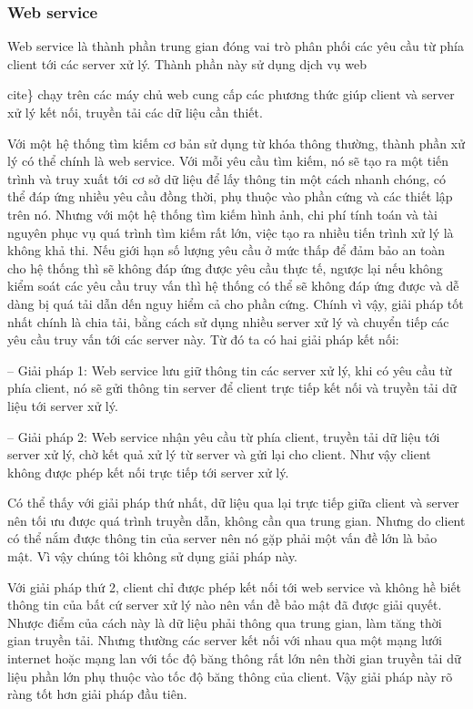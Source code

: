 \subsubsection{Web service}
Web service là thành phần trung gian đóng vai trò phân phối các yêu cầu từ phía client tới các server xử lý. Thành phần này sử dụng dịch vụ web {cite\} chạy trên các máy chủ web cung cấp các phương thức giúp client và server xử lý kết nối, truyền tải các dữ liệu cần thiết.

Với một hệ thống tìm kiếm cơ bản sử dụng từ khóa thông thường, thành phần xử lý có thể chính là web service. Với mỗi yêu cầu tìm kiếm, nó sẽ tạo ra một tiến trình và truy xuất tới cơ sở dữ liệu để lấy thông tin một cách nhanh chóng, có thể đáp ứng nhiều yêu cầu đồng thời, phụ thuộc vào phần cứng và các thiết lập trên nó. Nhưng với một hệ thống tìm kiếm hình ảnh, chi phí tính toán và tài nguyên phục vụ quá trình tìm kiếm rất lớn, việc tạo ra nhiều tiến trình xử lý là không khả thi. Nếu giới hạn số lượng yêu cầu ở mức thấp để đảm bảo an toàn cho hệ thống thì sẽ không đáp ứng được yêu cầu thực tế, ngược lại nếu không kiểm soát các yêu cầu truy vấn thì hệ thống có thể sẽ không đáp ứng được và dễ dàng bị quá tải dẫn dến nguy hiểm cả cho phần cứng. Chính vì vậy, giải pháp tốt nhất chính là chia tải, bằng cách sử dụng nhiều server xử lý và chuyển tiếp các yêu cầu truy vấn tới các server này. Từ đó ta có hai giải pháp kết nối:

-- Giải pháp 1: Web service lưu giữ thông tin các server xử lý, khi có yêu cầu từ phía client, nó sẽ gửi thông tin server để client trực tiếp kết nối và truyền tải dữ liệu tới server xử lý.

-- Giải pháp 2: Web service nhận yêu cầu từ phía client, truyền tải dữ liệu tới server xử lý, chờ kết quả xử lý từ server và gửi lại cho client. Như vậy client không được phép kết nối trực tiếp tới server xử lý.

Có thể thấy với giải pháp thứ nhất, dữ liệu qua lại trực tiếp giữa client và server nên tối ưu được quá trình truyền dẫn, không cần qua trung gian. Nhưng do client có thể nắm được thông tin của server nên nó gặp phải một vấn đề lớn là bảo mật. Vì vậy chúng tôi không sử dụng giải pháp này.

Với giải pháp thứ 2, client chỉ được phép kết nối tới web service và không hề biết thông tin của bất cứ server xử lý nào nên vấn đề bảo mật đã được giải quyết. Nhược điểm của cách này là dữ liệu phải thông qua trung gian, làm tăng thời gian truyền tải. Nhưng thường các server kết nối với nhau qua một mạng lưới internet hoặc mạng lan với tốc độ băng thông rất lớn nên thời gian truyền tải dữ liệu phần lớn phụ thuộc vào tốc độ băng thông của client. Vậy giải pháp này rõ ràng tốt hơn giải pháp đầu tiên.

}
